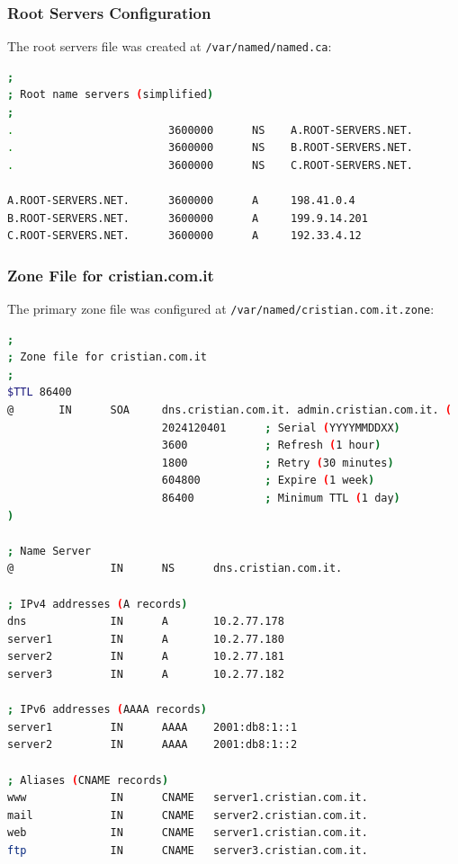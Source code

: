 \documentclass[12pt,a4paper]{article}
\begin{document}
\subsubsection{Root Servers Configuration}
The root servers file was created at \texttt{/var/named/named.ca}:

\begin{lstlisting}[language=bash, caption=Root Servers Configuration]
;
; Root name servers (simplified)
;
.                        3600000      NS    A.ROOT-SERVERS.NET.
.                        3600000      NS    B.ROOT-SERVERS.NET.
.                        3600000      NS    C.ROOT-SERVERS.NET.

A.ROOT-SERVERS.NET.      3600000      A     198.41.0.4
B.ROOT-SERVERS.NET.      3600000      A     199.9.14.201
C.ROOT-SERVERS.NET.      3600000      A     192.33.4.12
\end{lstlisting}

\subsubsection{Zone File for cristian.com.it}
The primary zone file was configured at \texttt{/var/named/cristian.com.it.zone}:

\begin{lstlisting}[language=bash, caption=Zone File for cristian.com.it]
;
; Zone file for cristian.com.it
;
$TTL 86400
@       IN      SOA     dns.cristian.com.it. admin.cristian.com.it. (
                        2024120401      ; Serial (YYYYMMDDXX)
                        3600            ; Refresh (1 hour)
                        1800            ; Retry (30 minutes)
                        604800          ; Expire (1 week)
                        86400           ; Minimum TTL (1 day)
)

; Name Server
@               IN      NS      dns.cristian.com.it.

; IPv4 addresses (A records)
dns             IN      A       10.2.77.178
server1         IN      A       10.2.77.180
server2         IN      A       10.2.77.181
server3         IN      A       10.2.77.182

; IPv6 addresses (AAAA records)
server1         IN      AAAA    2001:db8:1::1
server2         IN      AAAA    2001:db8:1::2

; Aliases (CNAME records)
www             IN      CNAME   server1.cristian.com.it.
mail            IN      CNAME   server2.cristian.com.it.
web             IN      CNAME   server1.cristian.com.it.
ftp             IN      CNAME   server3.cristian.com.it.
\end{lstlisting}
\end{document}
